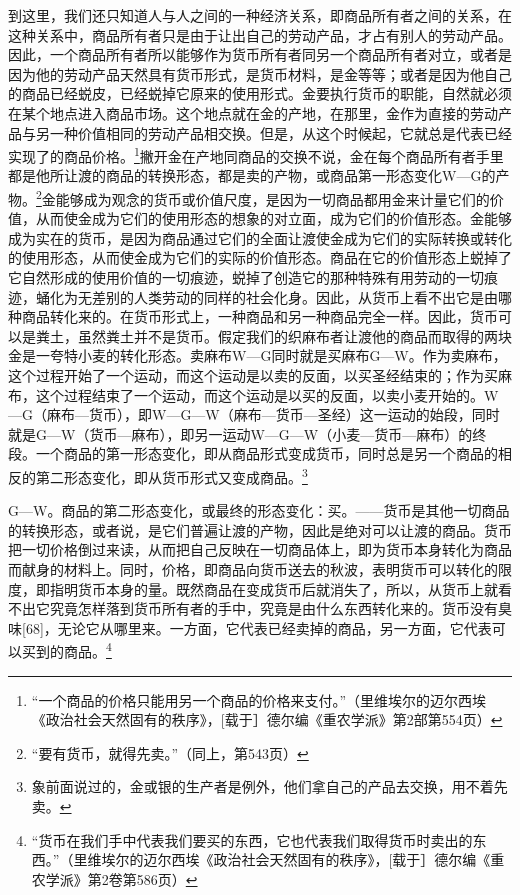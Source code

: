 \documentclass{ctexbook}
\begin{document}
        到这里，我们还只知道人与人之间的一种经济关系，即商品所有者之间的关系，在这种关系中，商品所有者只是由于让出自己的劳动产品，才占有别人的劳动产品。因此，一个商品所有者所以能够作为货币所有者同另一个商品所有者对立，或者是因为他的劳动产品天然具有货币形式，是货币材料，是金等等；或者是因为他自己的商品已经蜕皮，已经蜕掉它原来的使用形式。金要执行货币的职能，自然就必须在某个地点进入商品市场。这个地点就在金的产地，在那里，金作为直接的劳动产品与另一种价值相同的劳动产品相交换。但是，从这个时候起，它就总是代表已经实现了的商品价格。\footnote{“一个商品的价格只能用另一个商品的价格来支付。”（里维埃尔的迈尔西埃《政治社会天然固有的秩序》，[载于］德尔编《重农学派》第2部第554页）}撇开金在产地同商品的交换不说，金在每个商品所有者手里都是他所让渡的商品的转换形态，都是卖的产物，或商品第一形态变化W—G的产物。\footnote{“要有货币，就得先卖。”（同上，第543页）}金能够成为观念的货币或价值尺度，是因为一切商品都用金来计量它们的价值，从而使金成为它们的使用形态的想象的对立面，成为它们的价值形态。金能够成为实在的货币，是因为商品通过它们的全面让渡使金成为它们的实际转换或转化的使用形态，从而使金成为它们的实际的价值形态。商品在它的价值形态上蜕掉了它自然形成的使用价值的一切痕迹，蜕掉了创造它的那种特殊有用劳动的一切痕迹，蛹化为无差别的人类劳动的同样的社会化身。因此，从货币上看不出它是由哪种商品转化来的。在货币形式上，一种商品和另一种商品完全一样。因此，货币可以是粪土，虽然粪土并不是货币。假定我们的织麻布者让渡他的商品而取得的两块金是一夸特小麦的转化形态。卖麻布W—G同时就是买麻布G—W。作为卖麻布，这个过程开始了一个运动，而这个运动是以卖的反面，以买圣经结束的；作为买麻布，这个过程结束了一个运动，而这个运动是以买的反面，以卖小麦开始的。W—G（麻布—货币），即W—G—W（麻布—货币—圣经）这一运动的始段，同时就是G—W（货币—麻布），即另一运动W—G—W（小麦—货币—麻布）的终段。一个商品的第一形态变化，即从商品形式变成货币，同时总是另一个商品的相反的第二形态变化，即从货币形式又变成商品。\footnote{象前面说过的，金或银的生产者是例外，他们拿自己的产品去交换，用不着先卖。}
        
        G—W。商品的第二形态变化，或最终的形态变化：买。——货币是其他一切商品的转换形态，或者说，是它们普遍让渡的产物，因此是绝对可以让渡的商品。货币把一切价格倒过来读，从而把自己反映在一切商品体上，即为货币本身转化为商品而献身的材料上。同时，价格，即商品向货币送去的秋波，表明货币可以转化的限度，即指明货币本身的量。既然商品在变成货币后就消失了，所以，从货币上就看不出它究竟怎样落到货币所有者的手中，究竟是由什么东西转化来的。货币没有臭味[68]，无论它从哪里来。一方面，它代表已经卖掉的商品，另一方面，它代表可以买到的商品。\footnote{“货币在我们手中代表我们要买的东西，它也代表我们取得货币时卖出的东西。”（里维埃尔的迈尔西埃《政治社会天然固有的秩序》，[载于］德尔编《重农学派》第2卷第586页）}
        
\end{document}
